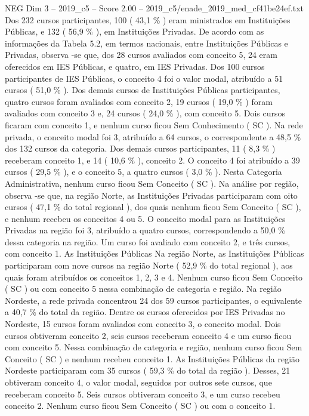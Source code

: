 \begin{textsample}{NEG Dim 3 – 2019\_c5 – Score 2.00 – 2019\_c5/enade\_2019\_med\_cf41be24ef.txt}
Dos 232 cursos participantes, 100 ( 43,1 \% ) eram ministrados em Instituições Públicas, e 132 ( 56,9 \% ), em Instituições Privadas.
De acordo com as informações da Tabela 5.2, em termos nacionais, entre Instituições Públicas e Privadas, observa -se que, dos 28 cursos avaliados com conceito 5, 24 eram oferecidos em IES Públicas, e quatro, em IES Privadas.
Dos 100 cursos participantes de IES Públicas, o conceito 4 foi o valor modal, atribuído a 51 cursos ( 51,0 \% ).
Dos demais cursos de Instituições Públicas participantes, quatro cursos foram avaliados com conceito 2, 19 cursos ( 19,0 \% ) foram avaliados com conceito 3 e, 24 cursos ( 24,0 \% ), com conceito 5.
Dois cursos ficaram com conceito 1, e nenhum curso ficou Sem Conhecimento ( SC ).
Na rede privada, o conceito modal foi 3, atribuído a 64 cursos, o correspondente a 48,5 \% dos 132 cursos da categoria.
Dos demais cursos participantes, 11 ( 8,3 \% ) receberam conceito 1, e 14 ( 10,6 \% ), conceito 2.
O conceito 4 foi atribuído a 39 cursos ( 29,5 \% ), e o conceito 5, a quatro cursos ( 3,0 \% ).
Nesta Categoria Administrativa, nenhum curso ficou Sem Conceito ( SC ).
Na análise por região, observa -se que, na região Norte, as Instituições Privadas participaram com oito cursos ( 47,1 \% do total regional ), dos quais nenhum ficou Sem Conceito ( SC ), e nenhum recebeu os conceitos 4 ou 5.
O conceito modal para as Instituições Privadas na região foi 3, atribuído a quatro cursos, correspondendo a 50,0 \% dessa categoria na região.
Um curso foi avaliado com conceito 2, e três cursos, com conceito 1.
As Instituições Públicas Na região Norte, as Instituições Públicas participaram com nove cursos na região Norte ( 52,9 \% do total regional ), aos quais foram atribuídos os conceitos 1, 2, 3 e 4.
Nenhum curso ficou Sem Conceito ( SC ) ou com conceito 5 nessa combinação de categoria e região.
Na região Nordeste, a rede privada concentrou 24 dos 59 cursos participantes, o equivalente a 40,7 \% do total da região.
Dentre os cursos oferecidos por IES Privadas no Nordeste, 15 cursos foram avaliados com conceito 3, o conceito modal.
Dois cursos obtiveram conceito 2, seis cursos receberam conceito 4 e um curso ficou com conceito 5.
Nessa combinação de categoria e região, nenhum curso ficou Sem Conceito ( SC ) e nenhum recebeu conceito 1.
As Instituições Públicas da região Nordeste participaram com 35 cursos ( 59,3 \% do total da região ).
Desses, 21 obtiveram conceito 4, o valor modal, seguidos por outros sete cursos, que receberam conceito 5.
Seis cursos obtiveram conceito 3, e um curso recebeu conceito 2.
Nenhum curso ficou Sem Conceito ( SC ) ou com o conceito 1.

\end{textsample}
